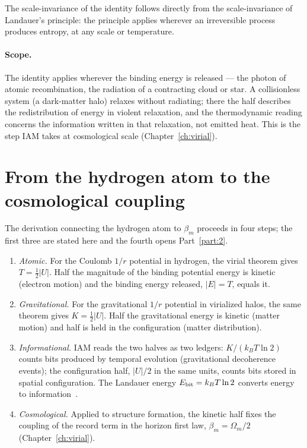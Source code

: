 The scale-invariance of the identity follows directly from the scale-invariance of Landauer's principle: the principle applies wherever an irreversible
process produces entropy, at any scale or temperature. \interp

\paragraph{Scope.} The identity applies wherever the binding energy is released --- the photon of atomic recombination, the radiation of a contracting
cloud or star. A collisionless system (a dark-matter halo) relaxes without radiating; there the half describes the redistribution of energy in violent
relaxation, and the thermodynamic reading concerns the information written in that relaxation, not emitted heat. This is the step IAM takes at
cosmological scale (Chapter~\ref{ch:virial}). \interp

\section{From the hydrogen atom to the cosmological coupling}\label{sec:vi_chain}
The derivation connecting the hydrogen atom to $\beta_m$ proceeds in four steps; the first three are stated here and the fourth opens Part~\ref{part:2}.
\begin{enumerate}
\item \emph{Atomic.} For the Coulomb $1/r$ potential in hydrogen, the virial theorem gives $T=\tfrac12|U|$. Half the magnitude of the binding potential
energy is kinetic (electron motion) and the binding energy released, $|E|=T$, equals it. \derived
\item \emph{Gravitational.} For the gravitational $1/r$ potential in virialized halos, the same theorem gives $K=\tfrac12|U|$. Half the gravitational
energy is kinetic (matter motion) and half is held in the configuration (matter distribution). \derived
\item \emph{Informational.} IAM reads the two halves as two ledgers: $K/(k_BT\ln2)$ counts bits produced by temporal evolution (gravitational decoherence
events); the configuration half, $|U|/2$ in the same units, counts bits stored in spatial configuration. The Landauer energy $E_{\rm bit}=k_BT\ln2$
converts energy to information~\cite{Landauer1961}. \interp
\item \emph{Cosmological.} Applied to structure formation, the kinetic half fixes the coupling of the record term in the horizon first law, $\beta_m=\Omega_m/2$
(Chapter~\ref{ch:virial}). \prediction
\end{enumerate}

